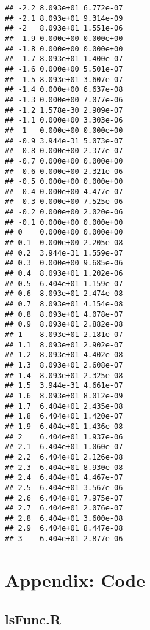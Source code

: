 \documentclass[
  12pt,
]{article}
\begin{document}
\begin{verbatim}
## -2.2 8.093e+01 6.772e-07
## -2.1 8.093e+01 9.314e-09
## -2   8.093e+01 1.551e-06
## -1.9 0.000e+00 0.000e+00
## -1.8 0.000e+00 0.000e+00
## -1.7 8.093e+01 1.400e-07
## -1.6 0.000e+00 5.501e-07
## -1.5 8.093e+01 3.607e-07
## -1.4 0.000e+00 6.637e-08
## -1.3 0.000e+00 7.077e-06
## -1.2 1.578e-30 2.909e-07
## -1.1 0.000e+00 3.303e-06
## -1   0.000e+00 0.000e+00
## -0.9 3.944e-31 5.073e-07
## -0.8 0.000e+00 2.377e-07
## -0.7 0.000e+00 0.000e+00
## -0.6 0.000e+00 2.321e-06
## -0.5 0.000e+00 0.000e+00
## -0.4 0.000e+00 4.477e-07
## -0.3 0.000e+00 7.525e-06
## -0.2 0.000e+00 2.020e-06
## -0.1 0.000e+00 0.000e+00
## 0    0.000e+00 0.000e+00
## 0.1  0.000e+00 2.205e-08
## 0.2  3.944e-31 1.559e-07
## 0.3  0.000e+00 9.685e-06
## 0.4  8.093e+01 1.202e-06
## 0.5  6.404e+01 1.159e-07
## 0.6  8.093e+01 2.474e-08
## 0.7  8.093e+01 4.154e-08
## 0.8  8.093e+01 4.078e-07
## 0.9  8.093e+01 2.882e-08
## 1    8.093e+01 2.181e-07
## 1.1  8.093e+01 2.902e-07
## 1.2  8.093e+01 4.402e-08
## 1.3  8.093e+01 2.608e-07
## 1.4  8.093e+01 2.325e-08
## 1.5  3.944e-31 4.661e-07
## 1.6  8.093e+01 8.012e-09
## 1.7  6.404e+01 2.435e-08
## 1.8  6.404e+01 1.420e-07
## 1.9  6.404e+01 1.436e-08
## 2    6.404e+01 1.937e-06
## 2.1  6.404e+01 1.060e-07
## 2.2  6.404e+01 2.126e-08
## 2.3  6.404e+01 8.930e-08
## 2.4  6.404e+01 4.467e-07
## 2.5  6.404e+01 3.567e-06
## 2.6  6.404e+01 7.975e-07
## 2.7  6.404e+01 2.076e-07
## 2.8  6.404e+01 3.600e-08
## 2.9  6.404e+01 8.447e-08
## 3    6.404e+01 2.877e-06
\end{verbatim}

\normalsize

\section{Appendix: Code}\label{appendix-code}

\subsection{lsFunc.R}\label{lsfunc.r}

\footnotesize
\end{document}
